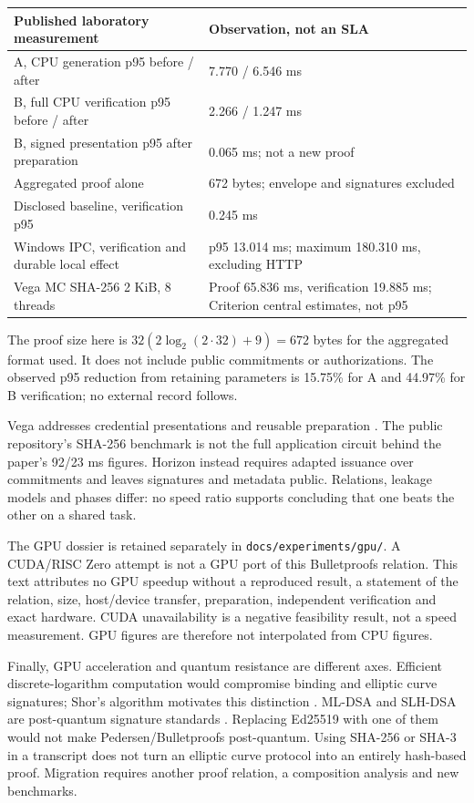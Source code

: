 \documentclass[11pt,a4paper]{article}
\newcommand{\code}[1]{\nolinkurl{#1}}
\begin{document}
\begin{center}\small
\begin{tabular}{p{.46\linewidth}p{.4\linewidth}}
\toprule
Published laboratory measurement & Observation, not an SLA \\
\midrule
A, CPU generation p95 before / after & 7.770 / 6.546 ms \\
B, full CPU verification p95 before / after & 2.266 / 1.247 ms \\
B, signed presentation p95 after preparation & 0.065 ms; not a new proof \\
Aggregated proof alone & 672 bytes; envelope and signatures excluded \\
Disclosed baseline, verification p95 & 0.245 ms \\
Windows IPC, verification and durable local effect & p95 13.014 ms; maximum 180.310 ms, excluding HTTP \\
Vega MC SHA-256 2 KiB, 8 threads & Proof 65.836 ms, verification 19.885 ms; Criterion central estimates, not p95 \\
\bottomrule
\end{tabular}\end{center}
The proof size here is $32(2\log_2(2\cdot32)+9)=672$ bytes for the
aggregated format used. It does not include public commitments or
authorizations. The observed p95 reduction from retaining parameters is
15.75\% for A and 44.97\% for B verification; no external record follows.

Vega addresses credential presentations and reusable preparation
\cite{vega,vegacode}. The public repository's SHA-256 benchmark is not the
full application circuit behind the paper's 92/23 ms figures. Horizon instead
requires adapted issuance over commitments and leaves signatures and metadata
public. Relations, leakage models and phases differ: no speed ratio supports
concluding that one beats the other on a shared task.

The GPU dossier is retained separately in \code{docs/experiments/gpu/}.
A CUDA/RISC Zero attempt is not a GPU port of this Bulletproofs relation.
This text attributes no GPU speedup without a reproduced result, a statement
of the relation, size, host/device transfer, preparation, independent
verification and exact hardware. CUDA unavailability is a negative feasibility
result, not a speed measurement. GPU figures are therefore not interpolated
from CPU figures.

Finally, GPU acceleration and quantum resistance are different axes.
Efficient discrete-logarithm computation would compromise binding and elliptic
curve signatures; Shor's algorithm motivates this distinction \cite{shor}.
ML-DSA and SLH-DSA are post-quantum signature standards
\cite{fips204,fips205}. Replacing Ed25519 with one of them would not make
Pedersen/Bulletproofs post-quantum. Using SHA-256 or SHA-3 in a transcript does
not turn an elliptic curve protocol into an entirely hash-based proof.
Migration requires another proof relation, a composition analysis and
new benchmarks.
\end{document}
